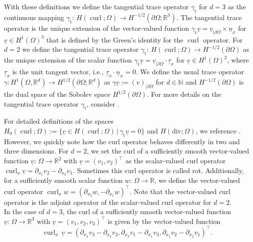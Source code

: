 \documentclass[a4paper,11pt]{article}
\newcommand{\N}{\mathbb N}
\newcommand{\R}{\mathbb R}
\newcommand{\cu}{\operatorname{curl}}
\newcommand{\trt}{\gamma_\mathrm{t}}
\renewcommand{\vec}[1]{\underline{#1}}
\begin{document}
With these definitions we define the tangential trace operator $\trt$ for $d=3$ as the continuous mapping $\trt \colon \, H(\cu;\Omega) \to H^{-1/2}(\partial \Omega;\R^3)$. The tangential trace operator is the unique extension of the vector-valued function $\trt \vec v = \vec v_{|\partial \Omega} \times \vec n_x$ for $\vec v \in H^1(\Omega)^3$ that is defined by the Green's identity for the $\cu$ operator. For $d=2$ we define the tangential trace operator $\trt \colon \, H(\cu;\Omega) \to H^{-1/2}(\partial \Omega)$ as the unique extension of the scalar function $\trt \vec v = \vec v_{|\partial \Omega} \cdot \vec \tau_x$ for $\vec v \in H^1(\Omega)^2$, where $\vec \tau_x $ is the unit tangent vector, i.e., $\vec \tau_x \cdot \vec n_x = 0$.  We define the usual trace operator  $\gamma: H^1(\Omega,\R^d)\to H^{1/2}(\partial \Omega;\R^d)$  as  $\gamma \vec v := (v)_{|\partial \Omega}$  for $d \in \N $ and  $H^{-1/2}(\partial \Omega)$ is the dual space of the  Sobolev space $H^{1/2}(\partial \Omega)$. For more details on the tangential trace operator $\trt$, consider \cite{Assous2018,ErnGuermond2020I,Monk}. 

For detailed definitions of the spaces $H_0(\cu;\Omega) := \{\vec v\in H(\cu;\Omega)\,|\, \trt \vec v = 0\}$ and $H(\mathrm{div};\Omega)$, we reference \cite{Monk}.  However, we quickly note how the curl operator behaves differently in two and three dimensions. For $d=2$, we set the curl of a sufficiently smooth vector-valued function $\vec v \colon \, \Omega \to \R^2$ with $\vec v = (v_1,v_2)^\top$ as the scalar-valued curl operator $\cu_x \vec v = \partial_{x_1} v_2 - \partial_{x_2} v_1$. Sometimes this curl operator is called rot. Additionally, for a sufficiently smooth scalar function $w \colon \, \Omega \to \R$, we define the vector-valued curl operator $\cu_x w=(\partial_{x_2} w, - \partial_{x_1} w)^\top.$ Note that the vector-valued curl operator is the adjoint operator of the scalar-valued curl operator for $d=2$.\\	
In the case of $d=3$, the curl of a sufficiently smooth vector-valued function $\vec v \colon \, \Omega \to \R^3$ with $\vec v= (v_1, v_2, v_3)^\top$ is given by the vector-valued function
\[\cu_x \, \vec v =\left( \partial_{x_2} v_3 - \partial_{x_3} v_2, \partial_{x_3} v_1 - \partial_{x_1} v_3, \partial_{x_1} v_2 - \partial_{x_2} v_1 \right)^\top. \]
\end{document}
